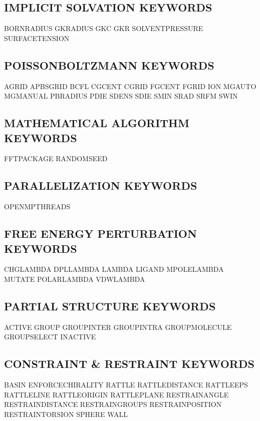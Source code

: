 \documentclass[letterpaper,11pt,english]{sphinxmanual}
\begin{document}
\subsection{IMPLICIT SOLVATION KEYWORDS}
\label{\detokenize{text/keywords:implicit-solvation-keywords}}
BORN\sphinxhyphen{}RADIUS     GK\sphinxhyphen{}RADIUS       GKC
GKR     SOLVENT\sphinxhyphen{}PRESSURE        SURFACE\sphinxhyphen{}TENSION


\subsection{POISSON\sphinxhyphen{}BOLTZMANN KEYWORDS}
\label{\detokenize{text/keywords:poisson-boltzmann-keywords}}
AGRID   APBS\sphinxhyphen{}GRID       BCFL
CGCENT  CGRID   FGCENT
FGRID   ION     MG\sphinxhyphen{}AUTO
MG\sphinxhyphen{}MANUAL       PB\sphinxhyphen{}RADIUS       PDIE
SDENS   SDIE    SMIN
SRAD    SRFM    SWIN


\subsection{MATHEMATICAL ALGORITHM KEYWORDS}
\label{\detokenize{text/keywords:mathematical-algorithm-keywords}}
FFT\sphinxhyphen{}PACKAGE     RANDOMSEED


\subsection{PARALLELIZATION KEYWORDS}
\label{\detokenize{text/keywords:parallelization-keywords}}
OPENMP\sphinxhyphen{}THREADS


\subsection{FREE ENERGY PERTURBATION KEYWORDS}
\label{\detokenize{text/keywords:free-energy-perturbation-keywords}}
CHG\sphinxhyphen{}LAMBDA      DPL\sphinxhyphen{}LAMBDA      LAMBDA
LIGAND  MPOLE\sphinxhyphen{}LAMBDA    MUTATE
POLAR\sphinxhyphen{}LAMBDA    VDW\sphinxhyphen{}LAMBDA


\subsection{PARTIAL STRUCTURE KEYWORDS}
\label{\detokenize{text/keywords:partial-structure-keywords}}
ACTIVE  GROUP   GROUP\sphinxhyphen{}INTER
GROUP\sphinxhyphen{}INTRA     GROUP\sphinxhyphen{}MOLECULE  GROUP\sphinxhyphen{}SELECT
INACTIVE


\subsection{CONSTRAINT \& RESTRAINT KEYWORDS}
\label{\detokenize{text/keywords:constraint-restraint-keywords}}
BASIN   ENFORCE\sphinxhyphen{}CHIRALITY       RATTLE
RATTLE\sphinxhyphen{}DISTANCE RATTLE\sphinxhyphen{}EPS      RATTLE\sphinxhyphen{}LINE
RATTLE\sphinxhyphen{}ORIGIN   RATTLE\sphinxhyphen{}PLANE    RESTRAIN\sphinxhyphen{}ANGLE
RESTRAIN\sphinxhyphen{}DISTANCE       RESTRAIN\sphinxhyphen{}GROUPS RESTRAIN\sphinxhyphen{}POSITION
RESTRAIN\sphinxhyphen{}TORSION        SPHERE  WALL
\end{document}
